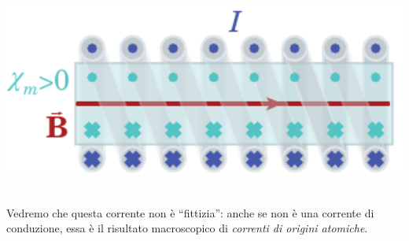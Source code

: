 \begin{minipage}{0.49\textwidth}
	\begin{center}
		\includegraphics[width=1\textwidth]{images/chp12/chp12solenoideriempito2b.pdf}
	\end{center}
\end{minipage}\\
Vedremo che questa corrente non è ``fittizia'': anche se non è una corrente di conduzione, essa è il risultato macroscopico di \textit{correnti di origini atomiche}.
